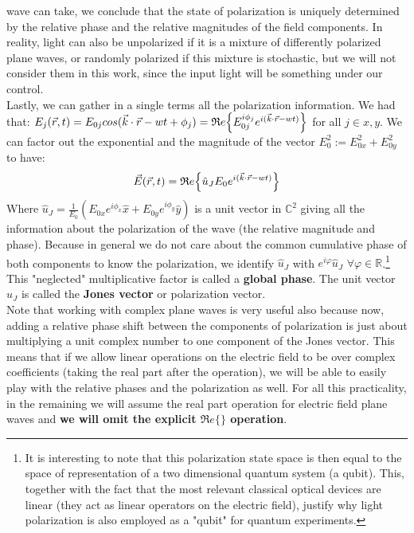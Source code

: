 \documentclass[11pt, a4paper, twoside]{article} %
\newcommand{\R}{\mathbb{R}} %
\newcommand{\C}{\mathbb{C}}
\DeclareRobustCommand{\mybox}[2][gray!10]{%
\begin{tcolorbox}[   %
        left=0.2cm,
        right=0.2cm,
        top=0.15cm,
        bottom=0.15cm,
        colback=#1,
        colframe=#1,
        width=\dimexpr\textwidth\relax, 
        enlarge left by=0mm,
        boxsep=5pt,
        arc=0pt,outer arc=0pt,
        ]
        #2
\end{tcolorbox}
}
\begin{document}
\mybox{wave can take, we conclude that the state of polarization is uniquely determined by the relative phase and the relative magnitudes of the field components. In reality, light can also be unpolarized if it is a mixture of differently polarized plane waves, or randomly polarized if this mixture is stochastic, but we will not consider them in this work, since the input light will be something under our control.\vspace{-0.1cm}\\

 Lastly, we can gather in a single terms all the polarization information. We had that: $E_j(\vec{r},t)=E_{0j}cos(\vec{k}\cdot\vec{r}-wt+\phi_j)=\mathfrak{R}e\qty{E_{0j}^{i\phi_j}e^{i(\vec{k}\cdot\vec{r}-wt)}}$ for all $j\in{x,y}$. We can factor out the exponential and the magnitude of the vector $E_0^2:=E_{0x}^2+E_{0y}^2$ to have:\vspace{-0.1cm}
\begin{equation}
\vec{E}(\vec{r},t)=\mathfrak{R}e\qty{\hat{u}_JE_0e^{i(\vec{k}\cdot\vec{r}-wt)} }\vspace{-0.1cm}
\end{equation}
Where $\hat{u}_J=\frac{1}{E_0}(E_{0x}e^{i\phi_x}\hat{x}+E_{0y}e^{i\phi_y}\hat{y})$ is a unit vector in $\C^2$ giving all the information about the polarization of the wave (the relative magnitude and phase). Because in general we do not care about the common cumulative phase of both components to know the polarization, we identify $\hat{u}_J$ with $e^{i\varphi}\hat{u}_J$ $\forall 	\varphi\in\R$.\footnote{It is interesting to note that this polarization state space is then equal to the space of representation of a two dimensional quantum system (a qubit). This, together with the fact that the most relevant classical optical devices are linear (they act as linear operators on the electric field), justify why light polarization is also employed as a "qubit" for quantum experiments.} This "neglected" multiplicative factor is called a {\bf global phase}. The unit vector $\hat{u}_J$ is called the {\bf Jones vector} or polarization vector.\vspace{-0.1cm}\\

Note that working with complex plane waves is very useful also because now, adding a relative phase shift between the components of polarization is just about multiplying a unit complex number to one component of the Jones vector. This means that if we allow linear operations on the electric field to be over complex coefficients (taking the real part after the operation), we will be able to easily play with the relative phases and the polarization as well. For all this practicality, in the remaining we will assume the real part operation for electric field plane waves and {\bf we will omit the explicit $\mathfrak{R}e\{\}$ operation}.
}\vspace{-0.5cm}
\end{document}
